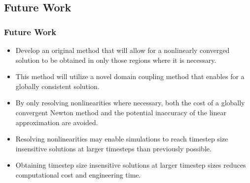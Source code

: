 \documentclass[compress,xcolor=table]{beamer}
\begin{document}
\subsection[Future Work]{Future Work}
\begin{frame}
\frametitle{Future Work}

\begin{itemize}
\item{Develop an original method that will allow for a nonlinearly converged solution to be obtained in only those regions where it is necessary.}
\item{This method will utilize a novel domain coupling method that enables for a globally consistent solution.}
\item{By only resolving nonlinearities where necessary, both the cost of a globally convergent Newton method and the potential inaccuracy of the linear approximation are avoided.}
\item{Resolving nonlinearities may enable simulations to reach timestep size insensitive solutions at larger timesteps than previously possible.}
\item{Obtaining timestep size insensitive solutions at larger timestep sizes reduces computational cost and engineering time.}
\end{itemize}

\end{frame}
\end{document}
